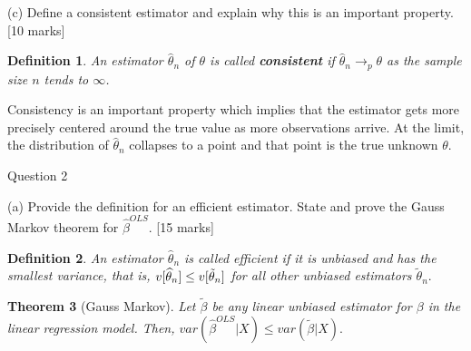\documentclass{article}
\newtheorem{theorem}{Theorem}
\newtheorem{definition}[theorem]{Definition}
\begin{document}
(c) Define a consistent estimator and explain why this is an important
property. [10 marks]

\begin{definition}
An estimator $\hat{\theta}_{n}$ of $\theta $ is called \textbf{consistent}
if $\hat{\theta}_{n}\rightarrow _{p}\theta $ as the sample size $n$ tends to 
$\infty $.
\end{definition}

Consistency is an important property which implies that the estimator gets
more precisely centered around the true value as more observations arrive.
At the limit, the distribution of $\hat{\theta}_{n}$ collapses to a point
and that point is the true unknown $\theta .$

Question 2

(a) Provide the definition for an efficient estimator. State and prove the
Gauss Markov theorem for $\hat{\beta}^{OLS}$. [15 marks]

\begin{definition}
An estimator $\hat{\theta}_{n}$ is called efficient if it is unbiased and
has the smallest variance, that is, $v[\widehat{\theta }_{n}]\leq v[\tilde{%
\theta}_{n}]$ for all other unbiased estimators $\tilde{\theta}_{n}.$
\end{definition}

\begin{theorem}[Gauss Markov]
Let $\widetilde{\beta }$ be any linear unbiased estimator for $\beta $ in
the linear regression model. Then, $var(\hat{\beta}^{OLS}|X)\leq var(%
\widetilde{\beta }|X).$
\end{theorem}
\end{document}
